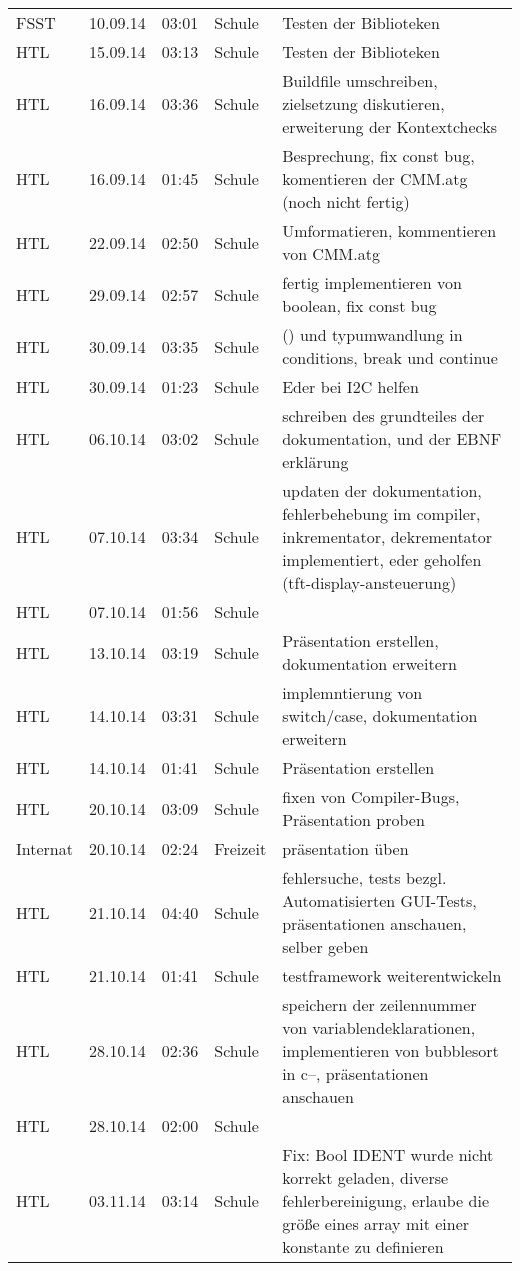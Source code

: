 \begin{small}
\begin{longtable}{ p{} p{} p{} p{} p{}}
FSST	& 10.09.14	& 03:01	& Schule	& Testen der Biblioteken \\
HTL	& 15.09.14	& 03:13	& Schule	& Testen der Biblioteken \\
HTL	& 16.09.14	& 03:36	& Schule	& Buildfile umschreiben, zielsetzung diskutieren, erweiterung der Kontextchecks \\
HTL	& 16.09.14	& 01:45	& Schule	& Besprechung, fix const bug, komentieren der CMM.atg (noch nicht fertig) \\
HTL	& 22.09.14	& 02:50	& Schule	& Umformatieren, kommentieren von CMM.atg \\
HTL	& 29.09.14	& 02:57	& Schule	& fertig implementieren von boolean, fix const bug \\
HTL	& 30.09.14	& 03:35	& Schule	& () und typumwandlung in conditions, break und continue \\
HTL	& 30.09.14	& 01:23	& Schule	& Eder bei I2C helfen \\
HTL	& 06.10.14	& 03:02	& Schule	& schreiben des grundteiles der dokumentation, und der EBNF erkl\"arung \\
HTL	& 07.10.14	& 03:34	& Schule	& updaten der dokumentation, fehlerbehebung im compiler, inkrementator, dekrementator implementiert, eder geholfen (tft-display-ansteuerung) \\
HTL	& 07.10.14	& 01:56	& Schule	&  \\
HTL	& 13.10.14	& 03:19	& Schule	& Pr\"asentation erstellen, dokumentation erweitern \\
HTL	& 14.10.14	& 03:31	& Schule	& implemntierung von switch/case, dokumentation erweitern \\
HTL	& 14.10.14	& 01:41	& Schule	& Pr\"asentation erstellen \\
HTL	& 20.10.14	& 03:09	& Schule	& fixen von Compiler-Bugs, Pr\"asentation proben \\
Internat	& 20.10.14	& 02:24	& Freizeit	& pr\"asentation \"uben \\
HTL	& 21.10.14	& 04:40	& Schule	& fehlersuche, tests bezgl. Automatisierten GUI-Tests, pr\"asentationen anschauen, selber geben \\
HTL	& 21.10.14	& 01:41	& Schule	& testframework weiterentwickeln \\
HTL	& 28.10.14	& 02:36	& Schule	& speichern der zeilennummer von variablendeklarationen, implementieren von bubblesort in c--, pr\"asentationen anschauen \\
HTL	& 28.10.14	& 02:00	& Schule	&  \\
HTL	& 03.11.14	& 03:14	& Schule	& Fix: Bool IDENT wurde nicht korrekt geladen, diverse fehlerbereinigung, erlaube die gr\"o\ss{}e eines array mit einer konstante zu definieren \\

\end{longtable}
\end{small}
